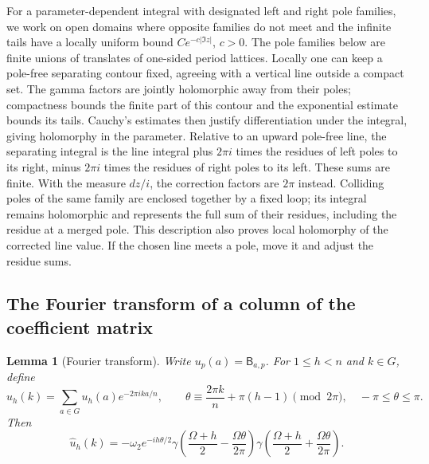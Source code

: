 \documentclass[11pt]{article}
\numberwithin{equation}{section}
\newtheorem{lemma}[theorem]{Lemma}
\theoremstyle{definition}
\theoremstyle{remark}
\begin{document}
For a parameter-dependent integral with designated left and right pole
families, we work on open domains where opposite families do not meet
and the infinite tails have a locally uniform bound $Ce^{-c|\Im z|}$,
$c>0$. The pole families below are finite unions of translates of
one-sided period lattices. Locally one can keep a pole-free separating
contour fixed, agreeing with a vertical line outside a compact set.
The gamma factors are jointly holomorphic away from their poles;
compactness bounds the finite part of this contour and the exponential
estimate bounds its tails. Cauchy's estimates then justify
differentiation under the integral, giving holomorphy in the parameter.
Relative to an upward pole-free line, the separating
integral is the line integral plus $2\pi i$ times the residues of
left poles to its right, minus $2\pi i$ times the residues of right
poles to its left. These sums are finite. With the measure $dz/i$,
the correction factors are $2\pi$ instead.
Colliding poles of the same family are enclosed together by a fixed
loop; its integral remains holomorphic and represents the full sum
of their residues, including the residue at a merged pole. This
description also proves local holomorphy of the corrected line value.
If the chosen line meets a pole, move it and adjust the residue sums.

\subsection{The Fourier transform of a column of the coefficient matrix}
\begin{lemma}[Fourier transform]\label{foundation:column-fourier}
Write $u_p(a)=\mathsf B_{a,p}$. For $1\leq h<n$ and $k\in G$, define
\[
 \widehat u_h(k)=\sum_{a\in G}u_h(a)e^{-2\pi ika/n},
 \qquad
 \theta\equiv\frac{2\pi k}{n}+\pi(h-1)\pmod{2\pi},
 \quad -\pi\leq\theta\leq\pi.
\]
Then
\begin{equation}\label{fd:fourier}
 \widehat u_h(k)
 =-\omega_2 e^{-ih\theta/2}
   \gamma\left(\frac{\Omega+h}{2}-\frac{\Omega\theta}{2\pi}\right)
   \gamma\left(\frac{\Omega+h}{2}+\frac{\Omega\theta}{2\pi}\right).
\end{equation}
\end{lemma}
\end{document}
